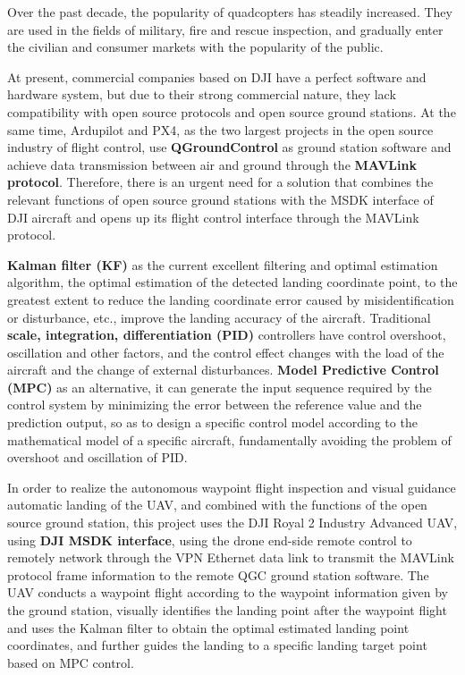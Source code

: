 \begin{enabstract}
Over the past decade, the popularity of quadcopters has steadily increased. They are used in the fields of military, fire and rescue inspection, and gradually enter the civilian and consumer markets with the popularity of the public.

At present, commercial companies based on DJI have a perfect software and hardware system, but due to their strong commercial nature, they lack compatibility with open source protocols and open source ground stations. At the same time, Ardupilot and PX4, as the two largest projects in the open source industry of flight control, use \textbf{QGroundControl} as ground station software and achieve data transmission between air and ground through the \textbf{MAVLink protocol}. Therefore, there is an urgent need for a solution that combines the relevant functions of open source ground stations with the MSDK interface of DJI aircraft and opens up its flight control interface through the MAVLink protocol.
  
\textbf{Kalman filter (KF)} as the current excellent filtering and optimal estimation algorithm, the optimal estimation of the detected landing coordinate point, to the greatest extent to reduce the landing coordinate error caused by misidentification or disturbance, etc., improve the landing accuracy of the aircraft. Traditional \textbf{scale, integration, differentiation (PID)} controllers have control overshoot, oscillation and other factors, and the control effect changes with the load of the aircraft and the change of external disturbances. \textbf{Model Predictive Control (MPC)} as an alternative, it can generate the input sequence required by the control system by minimizing the error between the reference value and the prediction output, so as to design a specific control model according to the mathematical model of a specific aircraft, fundamentally avoiding the problem of overshoot and oscillation of PID.
  
In order to realize the autonomous waypoint flight inspection and visual guidance automatic landing of the UAV, and combined with the functions of the open source ground station, this project uses the DJI Royal 2 Industry Advanced UAV, using \textbf{DJI MSDK interface}, using the drone end-side remote control to remotely network through the VPN Ethernet data link to transmit the MAVLink protocol frame information to the remote QGC ground station software. The UAV conducts a waypoint flight according to the waypoint information given by the ground station, visually identifies the landing point after the waypoint flight and uses the Kalman filter to obtain the optimal estimated landing point coordinates, and further guides the landing to a specific landing target point based on MPC control.

\end{enabstract}
